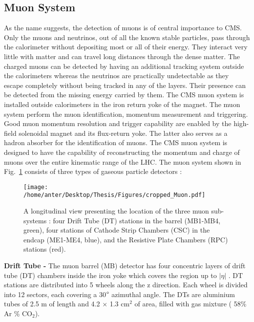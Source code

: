 \subsection{Muon System}
As the name suggests, the detection of muons is of central importance to CMS. Only the muons and neutrinos, out of all the known stable particles, pass through the calorimeter without depositing most or all of their energy. They interact very little with matter and can travel long distances through the dense matter. The charged muons can be detected by having an additional tracking system outside the calorimeters whereas the neutrinos are practically undetectable as they escape completely without being tracked in any of the layers. Their presence can be detected from the missing energy carried by them. The CMS muon system is installed outside calorimeters in the iron return yoke of the magnet. The muon system perform the muon identification, momentum measurement and triggering. Good muon momentum resolution and trigger capability are enabled by the high-field solenoidal magnet and its flux-return yoke. The latter also serves as a hadron absorber for the identification of muons. The CMS muon system is designed to have the capability of reconstructing the momentum and charge of muons over the entire kinematic range of the LHC. The muon system shown in Fig.~\ref{fig:muon} consists of three types of gaseous particle detectors : \\ \newline
\begin{figure}[!h]
\begin{center}
\vspace*{3mm} 
\hspace*{-5mm}
\texttt{[image: /home/anter/Desktop/Thesis/Figures/cropped\_Muon.pdf]}\\
\vspace*{4mm}
\caption[Muon]{A longitudinal view presenting the location of the three muon sub-systems : four Drift Tube (DT) stations in the barrel (MB1-MB4, green), four stations of Cathode Strip Chambers (CSC) in the endcap (ME1-ME4, blue), and the Resistive Plate Chambers (RPC) stations (red)\footnotemark.}
\label{fig:muon}
\end{center}
\end{figure}
{\bf Drift Tube -} 
The muon barrel (MB) detector has four concentric layers of drift tube (DT) chambers inside the iron yoke which covers the region up to $|\eta|$ . DT stations are distributed into 5 wheels along the z direction. Each wheel is divided into 12 sectors, each covering a 30$\degree$ azimuthal angle. The DTs are aluminium tubes of 2.5 m of length and 4.2 $\times$ 1.3 cm$^{2}$ of area, filled with gas mixture ( 58\% Ar  \% CO$_{2}$). \\ \newline {}
